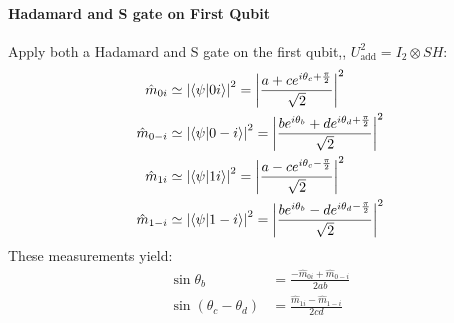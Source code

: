 \documentclass[a4paper, 11pt]{article}
\begin{document}
\paragraph{Hadamard and S gate on First Qubit}
Apply both a Hadamard and S gate on the first qubit,, $U_{\text{add}}^{2}=I_2 \otimes SH$:
\begin{align}
  \hat{m}_{0i} &\simeq \left| \bra{\psi}\ket{0i} \right|^2   = \left| \frac{a+c e^{i\theta_c + \frac{\pi}{2}}}{\sqrt{2}}\right|^2 \\ 
  \hat{m}_{0-i} &\simeq \left| \bra{\psi}\ket{0-i} \right|^2 = \left| \frac{b e^{i\theta_b}+d e^{i\theta_d + \frac{\pi}{2}}}{\sqrt{2}}\right|^2 \\ 
  \hat{m}_{1i} &\simeq \left| \bra{\psi}\ket{1i} \right|^2   = \left| \frac{a-c e^{i\theta_c - \frac{\pi}{2}}}{\sqrt{2}}\right|^2 \\ 
  \hat{m}_{1-i} &\simeq \left| \bra{\psi}\ket{1-i} \right|^2 = \left| \frac{b e^{i\theta_b}-d e^{i\theta_d - \frac{\pi}{2}}}{\sqrt{2}}\right|^2
\end{align}
These measurements yield: 
\begin{align}
  \sin\theta_{b} &= \frac{-\hat{m}_{0i} + \hat{m}_{0-i}}{2ab} \label{eq:TwoQubitQST3} \\
  \sin(\theta_{c} - \theta_{d}) &= \frac{\hat{m}_{1i} - \hat{m}_{1-i}}{2cd} \label{eq:TwoQubitQST4} \\
\end{align}
\end{document}
